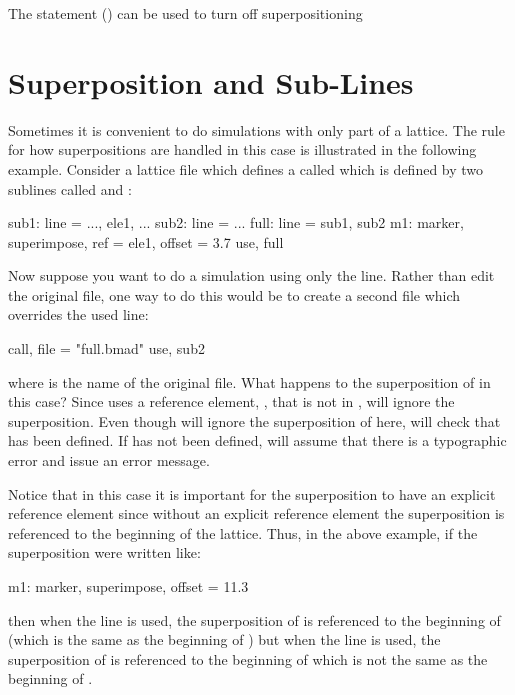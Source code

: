 The  statement () can be used to turn off superpositioning

\section{Superposition and Sub-Lines}
\label{c:super.sub.line}

Sometimes it is convenient to do simulations with only part of a lattice. The rule for how
superpositions are handled in this case is illustrated in the following example. Consider a lattice
file which defines a  called  which is defined by two sublines called 
and :
\begin{example}
  sub1: line = {..., ele1, ...}
  sub2: line = {...}
  full: line = {sub1, sub2}
  m1: marker, superimpose, ref = ele1, offset = 3.7
  use, full
\end{example}
Now suppose you want to do a simulation using only the  line. Rather than edit the original
file, one way to do this would be to create a second file which overrides the used line:
\begin{example}
  call, file = "full.bmad"
  use, sub2
\end{example}
where  is the name of the original file. What happens to the superposition of 
in this case? Since  uses a reference element, , that is not in , \bmad
will ignore the superposition. Even though \bmad will ignore the superposition of  here,
\bmad will check that  has been defined. If  has not been defined, \bmad will
assume that there is a typographic error and issue an error message.

Notice that in this case it is important for the superposition to have an explicit reference element
since without an explicit reference element the superposition is referenced to the beginning of the
lattice. Thus, in the above example, if the superposition were written like:
\begin{example}
  m1: marker, superimpose, offset = 11.3
\end{example}
then when the  line is used, the superposition of  is referenced to the beginning of
 (which is the same as the beginning of ) but when the  line is used, the
superposition of  is referenced to the beginning of  which is not the same as the
beginning of .

